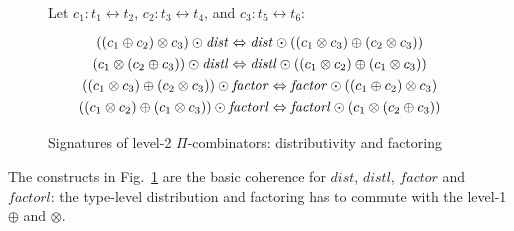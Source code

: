\documentclass{article}
\newcommand{\dist}{\ensuremath{\mathit{dist}}}
\newcommand{\factor}{\ensuremath{\mathit{factor}}}
\newcommand{\distl}{\ensuremath{\mathit{distl}}}
\newcommand{\factorl}{\ensuremath{\mathit{factorl}}}
\begin{document}
\begin{figure}[t]
Let $c_1 : t_1 \leftrightarrow t_2$, $c_2 : t_3 \leftrightarrow t_4$, and $c_3 : t_5 \leftrightarrow t_6$:
\[\def\arraystretch{1.3}
\begin{array}{c}
  {((c_1 \oplus c_2) \otimes c_3) \odot \dist \Leftrightarrow \dist \odot ((c_1 \otimes c_3) \oplus (c_2 \otimes c_3))}
\\
  {(c_1 \otimes (c_2 \oplus c_3)) \odot \distl \Leftrightarrow \distl \odot ((c_1 \otimes c_2) \oplus (c_1 \otimes c_3))}
\\
  {((c_1 \otimes c_3) \oplus (c_2 \otimes c_3)) \odot \factor \Leftrightarrow \factor \odot ((c_1 \oplus c_2) \otimes c_3)}
\\
  {((c_1 \otimes c_2) \oplus (c_1 \otimes c_3)) \odot \factorl \Leftrightarrow \factorl \odot (c_1 \otimes (c_2 \oplus c_3))}
\end{array}\]
\caption{\label{figi}Signatures of level-2 $\Pi$-combinators: distributivity and factoring}
\end{figure}

The constructs in Fig.~\ref{figi} are the basic coherence for
$\dist$, $\distl$, $\factor$ and $\factorl$: the type-level distribution
and factoring has to commute with the level-1 $\oplus$ and $\otimes$.

\end{document}
